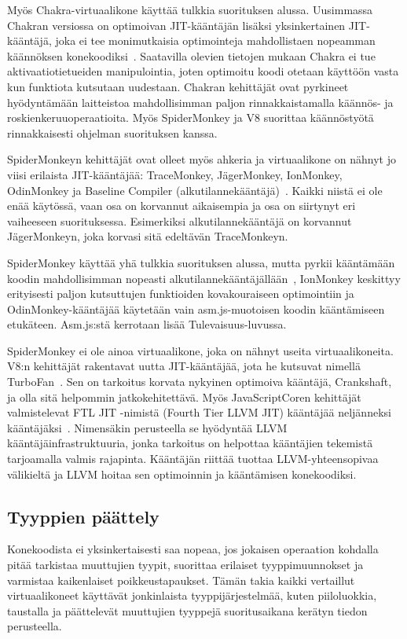 Myös Chakra-virtuaalikone käyttää tulkkia suorituksen alussa. Uusimmassa Chakran versiossa on optimoivan JIT-kääntäjän lisäksi yksinkertainen JIT-kääntäjä, joka ei tee monimutkaisia optimointeja mahdollistaen nopeamman käännöksen konekoodiksi~\cite{chakra}. Saatavilla olevien tietojen mukaan Chakra ei tue aktivaatiotietueiden manipulointia, joten optimoitu koodi otetaan käyttöön vasta kun funktiota kutsutaan uudestaan. Chakran kehittäjät ovat pyrkineet hyödyntämään laitteistoa mahdollisimman paljon rinnakkaistamalla käännös- ja roskienkeruuoperaatioita. Myös SpiderMonkey ja V8 suorittaa käännöstyötä rinnakkaisesti ohjelman suorituksen kanssa.

SpiderMonkeyn kehittäjät ovat olleet myös ahkeria ja virtuaalikone on nähnyt jo viisi erilaista JIT-kääntäjää: TraceMonkey, JägerMonkey, IonMonkey, OdinMonkey ja Baseline Compiler (alkutilannekääntäjä)~\cite{monkeys}. Kaikki niistä ei ole enää käytössä, vaan osa on korvannut aikaisempia ja osa on siirtynyt eri vaiheeseen suorituksessa. Esimerkiksi alkutilannekääntäjä on korvannut JägerMonkeyn, joka korvasi sitä edeltävän TraceMonkeyn.

SpiderMonkey käyttää yhä tulkkia suorituksen alussa, mutta pyrkii kääntämään koodin mahdollisimman nopeasti alkutilannekääntäjällään~\cite{baseline}, IonMonkey keskittyy erityisesti paljon kutsuttujen funktioiden kovakouraiseen optimointiin ja OdinMonkey-kääntäjää käytetään vain asm.js-muotoisen koodin kääntämiseen etukäteen. Asm.js:stä kerrotaan lisää Tulevaisuus-luvussa.

SpiderMonkey ei ole ainoa virtuaalikone, joka on nähnyt useita virtuaalikoneita. V8:n kehittäjät rakentavat uutta JIT-kääntäjää, jota he kutsuvat nimellä TurboFan~\cite{turbofan}. Sen on tarkoitus korvata nykyinen optimoiva kääntäjä, Crankshaft, ja olla sitä helpommin jatkokehitettävä. Myös JavaScriptCoren kehittäjät valmistelevat FTL JIT -nimistä (Fourth Tier LLVM JIT) kääntäjää neljänneksi kääntäjäksi~\cite{ftljit}. Nimensäkin perusteella se hyödyntää LLVM kääntäjäinfrastruktuuria, jonka tarkoitus on helpottaa kääntäjien tekemistä tarjoamalla valmis rajapinta. Kääntäjän riittää tuottaa LLVM-yhteensopivaa välikieltä ja LLVM hoitaa sen optimoinnin ja kääntämisen konekoodiksi.

\subsection{Tyyppien päättely}

Konekoodista ei yksinkertaisesti saa nopeaa, jos jokaisen operaation kohdalla pitää tarkistaa muuttujien tyypit, suorittaa erilaiset tyyppimuunnokset ja varmistaa kaikenlaiset poikkeustapaukset. Tämän takia kaikki vertaillut virtuaalikoneet käyttävät jonkinlaista tyyppijärjestelmää, kuten piiloluokkia, taustalla ja päättelevät muuttujien tyyppejä suoritusaikana kerätyn tiedon perusteella.

